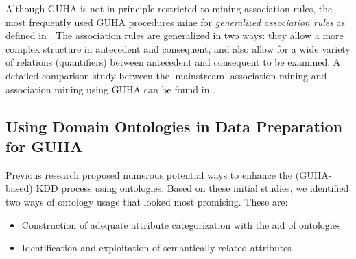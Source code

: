 Although GUHA is not in principle restricted to mining association rules, the most frequently used GUHA procedures mine for \emph{generalized association rules} as defined in \cite{Rauch}. 
The association rules are generalized in two ways: they allow a more complex structure in antecedent and consequent, and also allow for a wide variety of relations (quantifiers) between antecedent and consequent to be examined. 
A detailed comparison study between the `mainstream' association mining and association mining using GUHA can be found in \cite{HajekHolena}.





\subsection{Using Domain Ontologies in Data Preparation for GUHA}
\label{OntologiesDataPrep}

Previous research \cite{Cespivova,Ralbovsky} proposed numerous potential ways to enhance the (GUHA-based) KDD process using ontologies. 
Based on these initial studies, we identified two ways of ontology usage that looked most promising. 
These are:
\begin{itemize}
	\item Construction of adequate attribute categorization with the aid of ontologies
	\item Identification and exploitation of semantically related attributes
\end{itemize}

